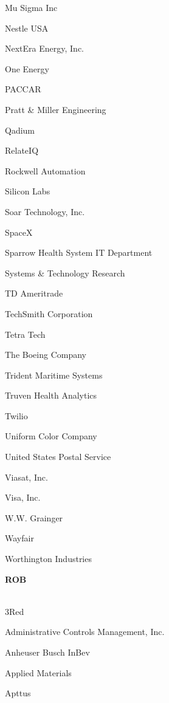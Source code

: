 \documentclass[twoside]{article}
\begin{document}
\begin{center}
\begin{multicols}{5}
\begin{FlushLeft}
\begin{compactitem}
\item Mu Sigma Inc
\item Nestle USA
\item NextEra Energy, Inc.
\item One Energy
\item PACCAR
\item Pratt \& Miller Engineering
\item Qadium
\item RelateIQ
\item Rockwell Automation
\item Silicon Labs
\item Soar Technology, Inc.
\item SpaceX
\item Sparrow Health System IT Department
\item Systems \& Technology Research
\item TD Ameritrade
\item TechSmith Corporation
\item Tetra Tech
\item The Boeing Company
\item Trident Maritime Systems
\item Truven Health Analytics
\item Twilio
\item Uniform Color Company
\item United States Postal Service
\item Viasat, Inc.
\item Visa, Inc.
\item W.W. Grainger
\item Wayfair
\item Worthington Industries
\end{compactitem}
        \end{FlushLeft}
        \vspace{1em}
        {\fontsize{14}{16}\selectfont \bf ROB}\\
        \vspace{-1em}
        ~\hrulefill~
        \vspace{-.9em}
        \begin{FlushLeft}
        \begin{compactitem}
        \item 3Red
\item Administrative Controls Management, Inc.
\item Anheuser Busch InBev
\item Applied Materials
\item Apttus

\end{compactitem}
\end{FlushLeft}
\end{multicols}
\end{center}
\end{document}
